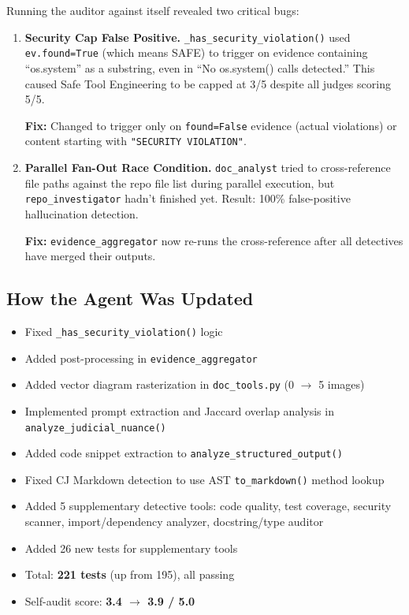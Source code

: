 \documentclass[11pt,a4paper]{article}
\begin{document}
Running the auditor against itself revealed two critical bugs:

\begin{enumerate}
    \item \textbf{Security Cap False Positive.}
        \texttt{\_has\_security\_violation()} used \texttt{ev.found=True}
        (which means SAFE) to trigger on evidence containing ``os.system''
        as a substring, even in ``No os.system() calls detected.''
        This caused Safe Tool Engineering to be capped at 3/5 despite
        all judges scoring 5/5.

        \textbf{Fix:} Changed to trigger only on \texttt{found=False}
        evidence (actual violations) or content starting with
        \texttt{"SECURITY VIOLATION"}.

    \item \textbf{Parallel Fan-Out Race Condition.}
        \texttt{doc\_analyst} tried to cross-reference file paths against
        the repo file list during parallel execution, but
        \texttt{repo\_investigator} hadn't finished yet.  Result: 100\%
        false-positive hallucination detection.

        \textbf{Fix:} \texttt{evidence\_aggregator} now re-runs the
        cross-reference after all detectives have merged their outputs.
\end{enumerate}

\subsection{How the Agent Was Updated}

\begin{itemize}
    \item Fixed \texttt{\_has\_security\_violation()} logic
    \item Added post-processing in \texttt{evidence\_aggregator}
    \item Added vector diagram rasterization in \texttt{doc\_tools.py} (0 $\rightarrow$ 5 images)
    \item Implemented prompt extraction and Jaccard overlap analysis in \texttt{analyze\_judicial\_nuance()}
    \item Added code snippet extraction to \texttt{analyze\_structured\_output()}
    \item Fixed CJ Markdown detection to use AST \texttt{to\_markdown()} method lookup
    \item Added 5 supplementary detective tools: code quality, test coverage, security scanner, import/dependency analyzer, docstring/type auditor
    \item Added 26 new tests for supplementary tools
    \item Total: \textbf{221 tests} (up from 195), all passing
    \item Self-audit score: \textbf{3.4 $\rightarrow$ 3.9 / 5.0}
\end{itemize}
\end{document}
